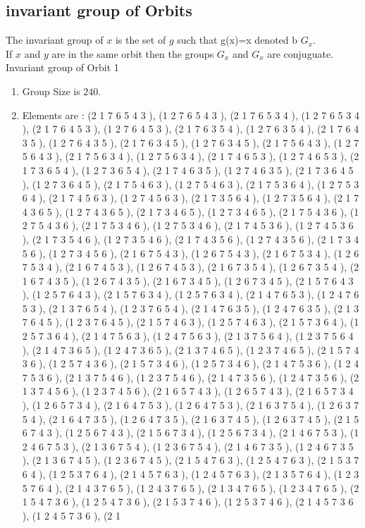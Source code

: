 \documentclass[12pt]{article}
\begin{document}
\subsection{invariant group of Orbits}
\noindent The invariant group of $x$ is the set of $g$ such that g(x)=x denoted b $G_x$.\\
If $x$ and $y$ are in the same orbit then the groups $G_x$ and  $G_x$ are conjuguate.\\
Invariant group of Orbit 1
\begin{enumerate}
\item Group Size is $240$.
\item Elements are : (2 1 7 6 5 4 3  ), (1 2 7 6 5 4 3  ), (2 1 7 6 5 3 4  ), (1 2 7 6 5 3 4  ), (2 1 7 6 4 5 3  ), (1 2 7 6 4 5 3  ), (2 1 7 6 3 5 4  ), (1 2 7 6 3 5 4  ), (2 1 7 6 4 3 5  ), (1 2 7 6 4 3 5  ), (2 1 7 6 3 4 5  ), (1 2 7 6 3 4 5  ), (2 1 7 5 6 4 3  ), (1 2 7 5 6 4 3  ), (2 1 7 5 6 3 4  ), (1 2 7 5 6 3 4  ), (2 1 7 4 6 5 3  ), (1 2 7 4 6 5 3  ), (2 1 7 3 6 5 4  ), (1 2 7 3 6 5 4  ), (2 1 7 4 6 3 5  ), (1 2 7 4 6 3 5  ), (2 1 7 3 6 4 5  ), (1 2 7 3 6 4 5  ), (2 1 7 5 4 6 3  ), (1 2 7 5 4 6 3  ), (2 1 7 5 3 6 4  ), (1 2 7 5 3 6 4  ), (2 1 7 4 5 6 3  ), (1 2 7 4 5 6 3  ), (2 1 7 3 5 6 4  ), (1 2 7 3 5 6 4  ), (2 1 7 4 3 6 5  ), (1 2 7 4 3 6 5  ), (2 1 7 3 4 6 5  ), (1 2 7 3 4 6 5  ), (2 1 7 5 4 3 6  ), (1 2 7 5 4 3 6  ), (2 1 7 5 3 4 6  ), (1 2 7 5 3 4 6  ), (2 1 7 4 5 3 6  ), (1 2 7 4 5 3 6  ), (2 1 7 3 5 4 6  ), (1 2 7 3 5 4 6  ), (2 1 7 4 3 5 6  ), (1 2 7 4 3 5 6  ), (2 1 7 3 4 5 6  ), (1 2 7 3 4 5 6  ), (2 1 6 7 5 4 3  ), (1 2 6 7 5 4 3  ), (2 1 6 7 5 3 4  ), (1 2 6 7 5 3 4  ), (2 1 6 7 4 5 3  ), (1 2 6 7 4 5 3  ), (2 1 6 7 3 5 4  ), (1 2 6 7 3 5 4  ), (2 1 6 7 4 3 5  ), (1 2 6 7 4 3 5  ), (2 1 6 7 3 4 5  ), (1 2 6 7 3 4 5  ), (2 1 5 7 6 4 3  ), (1 2 5 7 6 4 3  ), (2 1 5 7 6 3 4  ), (1 2 5 7 6 3 4  ), (2 1 4 7 6 5 3  ), (1 2 4 7 6 5 3  ), (2 1 3 7 6 5 4  ), (1 2 3 7 6 5 4  ), (2 1 4 7 6 3 5  ), (1 2 4 7 6 3 5  ), (2 1 3 7 6 4 5  ), (1 2 3 7 6 4 5  ), (2 1 5 7 4 6 3  ), (1 2 5 7 4 6 3  ), (2 1 5 7 3 6 4  ), (1 2 5 7 3 6 4  ), (2 1 4 7 5 6 3  ), (1 2 4 7 5 6 3  ), (2 1 3 7 5 6 4  ), (1 2 3 7 5 6 4  ), (2 1 4 7 3 6 5  ), (1 2 4 7 3 6 5  ), (2 1 3 7 4 6 5  ), (1 2 3 7 4 6 5  ), (2 1 5 7 4 3 6  ), (1 2 5 7 4 3 6  ), (2 1 5 7 3 4 6  ), (1 2 5 7 3 4 6  ), (2 1 4 7 5 3 6  ), (1 2 4 7 5 3 6  ), (2 1 3 7 5 4 6  ), (1 2 3 7 5 4 6  ), (2 1 4 7 3 5 6  ), (1 2 4 7 3 5 6  ), (2 1 3 7 4 5 6  ), (1 2 3 7 4 5 6  ), (2 1 6 5 7 4 3  ), (1 2 6 5 7 4 3  ), (2 1 6 5 7 3 4  ), (1 2 6 5 7 3 4  ), (2 1 6 4 7 5 3  ), (1 2 6 4 7 5 3  ), (2 1 6 3 7 5 4  ), (1 2 6 3 7 5 4  ), (2 1 6 4 7 3 5  ), (1 2 6 4 7 3 5  ), (2 1 6 3 7 4 5  ), (1 2 6 3 7 4 5  ), (2 1 5 6 7 4 3  ), (1 2 5 6 7 4 3  ), (2 1 5 6 7 3 4  ), (1 2 5 6 7 3 4  ), (2 1 4 6 7 5 3  ), (1 2 4 6 7 5 3  ), (2 1 3 6 7 5 4  ), (1 2 3 6 7 5 4  ), (2 1 4 6 7 3 5  ), (1 2 4 6 7 3 5  ), (2 1 3 6 7 4 5  ), (1 2 3 6 7 4 5  ), (2 1 5 4 7 6 3  ), (1 2 5 4 7 6 3  ), (2 1 5 3 7 6 4  ), (1 2 5 3 7 6 4  ), (2 1 4 5 7 6 3  ), (1 2 4 5 7 6 3  ), (2 1 3 5 7 6 4  ), (1 2 3 5 7 6 4  ), (2 1 4 3 7 6 5  ), (1 2 4 3 7 6 5  ), (2 1 3 4 7 6 5  ), (1 2 3 4 7 6 5  ), (2 1 5 4 7 3 6  ), (1 2 5 4 7 3 6  ), (2 1 5 3 7 4 6  ), (1 2 5 3 7 4 6  ), (2 1 4 5 7 3 6  ), (1 2 4 5 7 3 6  ), (2 1 
\end{enumerate}
\end{document}
